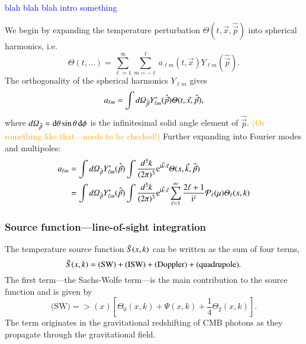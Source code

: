 \textcolor{blue}{blah blah blah intro something}


We begin by expanding the temperature perturbation $\Theta(t, \vec{x}, \hat{\vec{p}})$ into spherical harmonics,
i.e.
\begin{equation}
    \Theta(t, \dots) = \sum_{\ell=1}^{\infty} \sum_{m=-\ell}^{\ell} a_{\ell m}(t, \vec{x}) Y_{\ell m} (\hat{\vec{p}}).
\end{equation}
The orthogonality of the spherical harmonics $Y_{\ell m}$ gives
\begin{equation}
    a_{\ell m} = \int \dOmg[p] Y^*_{\ell m} (\hat{\vec{p}}) \Theta(t, \vec{x}, \hat{\vec{p}}),
\end{equation}
where $d\varOmega_{\hat{\vec{p}}} = \diff \theta \sin{\theta}\diff \phi$ is the infinitesimal solid angle element of $\hat{\vec{p}}$. \textcolor{orange}{(Or something like that---needs to be checked!)} Further expanding into Fourier modes and multipoles:
\begin{equation}
\begin{split}
    a_{\ell m} &= \int \dOmg[p] Y^*_{\ell m} (\hat{\vec{p}}) \int \frac{d^3 k}{(2\pi)^3} \eu[\im \vec{k}\cdot \vec{x}] \Theta(x, \vec{k}, \hat{\vec{p}})  \\
    &= \int \dOmg[p] Y^*_{\ell m} (\hat{\vec{p}}) \int \frac{d^3 k}{(2\pi)^3} \eu[\im \vec{k}\cdot \vec{x}]\sum_{{\ell=1}}^{\infty} \frac{2\ell + 1}{\im^\ell} \mathcal{P}_\ell(\mu) \Theta_\ell(x, k)
\end{split}
\end{equation}



\subsubsection{Source function---line-of-sight integration}
    The temperature source function $\St(x,k)$ can be written as the sum of four terms,
    \begin{equation}\label{mil4:theo:eq:source_function_four_terms}
        \St(x,k) = \text{(SW)} + \text{(ISW)} + \text{(Doppler)} + \text{(quadrupole)}.
    \end{equation}
    The first term---the Sachs-Wolfe term---is the main contribution to the source function and is given by
    \begin{equation}
        \text{(SW)} = \gt(x) \left[\Theta_0(x,k) + \Psi(x,k) + \frac{1}{4}\Theta_2(x,k) \right].
    \end{equation}
    The term originates in the gravitational redshifting of CMB photons as they propagate through the gravitational field.

